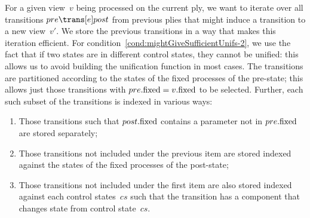 For a given view~$v$ being processed on the current ply, we want to iterate
over all transitions $pre \trans[e] post$ from previous plies that might
induce a transition to a new view~$v'$.  We store the previous transitions in
a way that makes this iteration efficient.  For
condition~\ref{cond:mightGiveSufficientUnifs-2}, we use the fact that if two
states are in different control states, they cannot be unified: this allows us
to avoid building the unification function in most cases.  The transitions are
partitioned according to the states of the fixed processes of the pre-state;
this allows just those transitions with $pre.\mathrm{fixed} = v.\mathrm{fixed}$ to be
selected.
Further, each such subset of the transitions is indexed in various ways:
%
\begin{enumerate}
\item\label{item:mightGiveSufficientUnifs-1} Those transitions such that
  $post.\mathrm{fixed}$ contains a parameter not in $pre.\mathrm{fixed}$ are stored
  separately;

\item\label{item:mightGiveSufficientUnifs-2} Those transitions not included
  under the previous item are stored indexed against the states of the
  fixed processes of the post-state;

\item\label{item:mightGiveSufficientUnifs-3} Those transitions not included
  under the first item are also stored indexed against each control
  states~$cs$ such that the transition has a component that changes state from
  control state~$cs$.
\end{enumerate}

